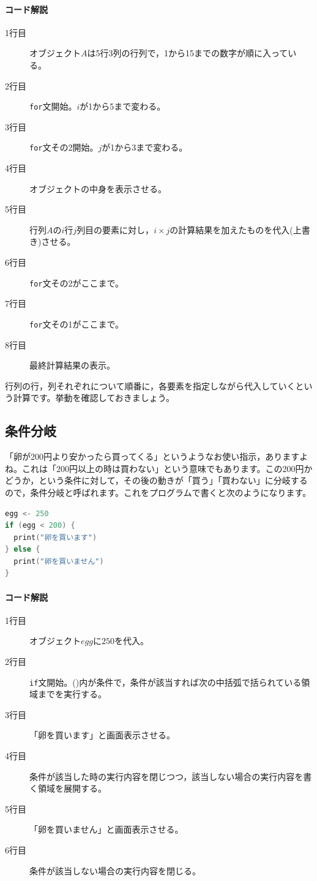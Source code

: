 \documentclass{ltjsbook}
\begin{document}
\paragraph{コード解説}
\begin{description}
	\item[1行目] オブジェクト$A$は5行3列の行列で，1から15までの数字が順に入っている。
	\item[2行目] \texttt{for}文開始。$i$が1から5まで変わる。
	\item[3行目] \texttt{for}文その2開始。$j$が1から3まで変わる。
	\item[4行目] オブジェクトの中身を表示させる。
	\item[5行目] 行列$A$の$i$行$j$列目の要素に対し，$i\times j$の計算結果を加えたものを代入(上書き)させる。
	\item[6行目] \texttt{for}文その2がここまで。
	\item[7行目] \texttt{for}文その1がここまで。
	\item[8行目] 最終計算結果の表示。
\end{description}

行列の行，列それぞれについて順番に，各要素を指定しながら代入していくという計算です。挙動を確認しておきましょう。

\subsection{条件分岐}
\label{if_statement}
「卵が200円より安かったら買ってくる」というようなお使い指示，ありますよね。これは「200円以上の時は買わない」という意味でもあります。この200円かどうか，という条件に対して，その後の動きが「買う」「買わない」に分岐するので，条件分岐と呼ばれます。これをプログラムで書くと次のようになります。
\begin{lstlisting}[language=c++,label={code:02_06},caption={条件分岐}]
egg <- 250
if (egg < 200) {
  print("卵を買います")
} else {
  print("卵を買いません")
}
\end{lstlisting}
\paragraph{コード解説}
\begin{description}
	\item[1行目] オブジェクト$egg$に$250$を代入。
	\item[2行目] \texttt{if}文開始。()内が条件で，条件が該当すれば次の中括弧で括られている領域までを実行する。
	\item[3行目] 「卵を買います」と画面表示させる。
	\item[4行目] 条件が該当した時の実行内容を閉じつつ，該当しない場合の実行内容を書く領域を展開する。
	\item[5行目] 「卵を買いません」と画面表示させる。
	\item[6行目] 条件が該当しない場合の実行内容を閉じる。
\end{description}
\end{document}

